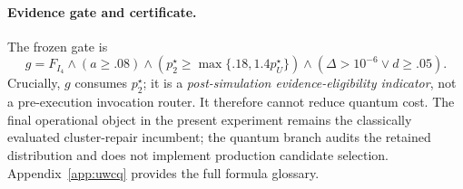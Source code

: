 


\paragraph{Evidence gate and certificate.}
The frozen gate is
\begin{equation}
 g=F_{I_4}\land(a\ge.08)\land\left(p_2^\star\ge\max\{.18,1.4p_U^\star\}\right)\land(\Delta>10^{-6}\lor d\ge.05).
 \label{eq:gate}
\end{equation}
Crucially, $g$ consumes $p_2^\star$; it is a \emph{post-simulation evidence-eligibility indicator}, not a pre-execution invocation router. It therefore cannot reduce quantum cost. The final operational object in the present experiment remains the classically evaluated cluster-repair incumbent; the quantum branch audits the retained distribution and does not implement production candidate selection. Appendix~\ref{app:uwcq} provides the full formula glossary.
